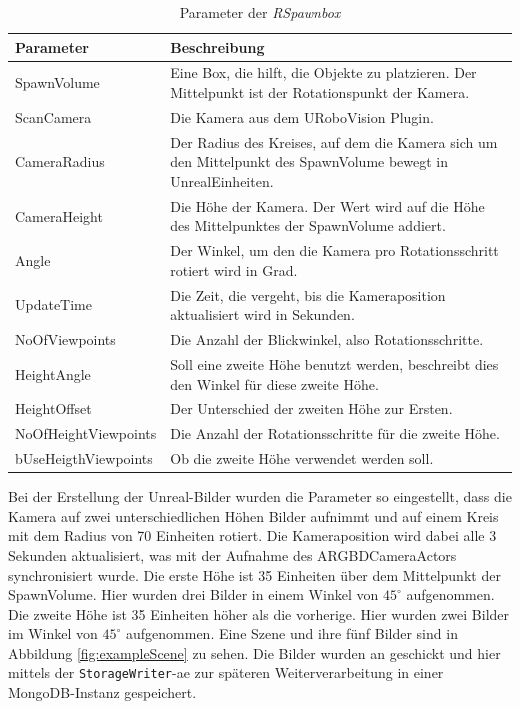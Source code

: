 \begin{table}
\begin{tabularx}{\textwidth}{lX}
\textbf{Parameter}  & \textbf{Beschreibung} \\ \hline
SpawnVolume         & Eine Box, die hilft, die Objekte zu platzieren. Der Mittelpunkt ist der Rotationspunkt der Kamera.\\  
ScanCamera          & Die Kamera aus dem URoboVision Plugin. \\ 
CameraRadius        & Der Radius des Kreises, auf dem die Kamera sich um den Mittelpunkt des SpawnVolume bewegt in UnrealEinheiten.\\ 
CameraHeight        & Die Höhe der Kamera. Der Wert wird auf die Höhe des Mittelpunktes der SpawnVolume addiert.\\ 
Angle               & Der Winkel, um den die Kamera pro Rotationsschritt rotiert wird in Grad.\\ 
UpdateTime          & Die Zeit, die vergeht, bis die Kameraposition aktualisiert wird in Sekunden.\\ 
NoOfViewpoints      & Die Anzahl der Blickwinkel, also Rotationsschritte.\\ 
HeightAngle         & Soll eine zweite Höhe benutzt werden, beschreibt dies den Winkel für diese zweite Höhe.\\ 
HeightOffset        & Der Unterschied der zweiten Höhe zur Ersten.\\
NoOfHeightViewpoints & Die Anzahl der Rotationsschritte für die zweite Höhe.\\ 
bUseHeigthViewpoints & Ob die zweite Höhe verwendet werden soll. \\  \hline
\end{tabularx}
\caption{Parameter der \textit{RSpawnbox}}
\label{tab:spawnboxParams}
\end{table}

Bei der Erstellung der Unreal-Bilder wurden die Parameter so eingestellt, dass die Kamera auf zwei unterschiedlichen Höhen Bilder aufnimmt und auf einem Kreis mit dem Radius von 70 Einheiten rotiert. Die Kameraposition wird dabei alle 3 Sekunden aktualisiert, was mit der Aufnahme des ARGBDCameraActors synchronisiert wurde. Die erste Höhe ist 35 Einheiten über dem Mittelpunkt der SpawnVolume. Hier wurden drei Bilder in einem Winkel von $45^\circ$ aufgenommen. Die zweite Höhe ist 35 Einheiten höher als die vorherige. Hier wurden zwei Bilder im Winkel von $45^\circ$ aufgenommen. Eine Szene und ihre fünf Bilder sind in Abbildung \ref{fig:exampleScene} zu sehen. Die Bilder wurden an \robosherlock geschickt und hier mittels der \texttt{StorageWriter}-\gls{ae} zur späteren Weiterverarbeitung in einer MongoDB-Instanz gespeichert.

